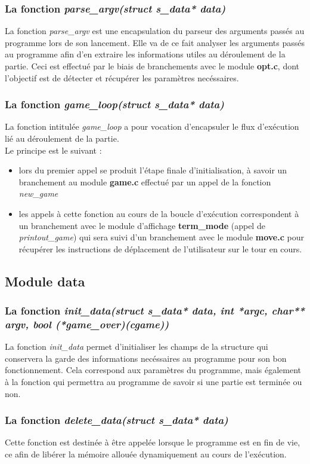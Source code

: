 \documentclass{report}
\begin{document}
\subsubsection*{La fonction \textit{parse\_argv(struct s\_data* data)}}
La fonction \textit{parse\_argv} est une encapsulation du parseur des arguments passés au programme lors de son lancement.
Elle va de ce fait analyser les arguments passés au programme afin d'en extraire les informations utiles au déroulement de la partie.
Ceci est effectué par le biais de branchements avec le module \textbf{opt.c}, dont l'objectif est de détecter et récupérer les paramètres necéssaires.
\subsubsection*{La fonction \textit{game\_loop(struct s\_data* data)}}
La fonction intitulée \textit{game\_loop} a pour vocation d'encapsuler le flux d'exécution lié au déroulement de la partie.\\
Le principe est le suivant :
\begin{itemize}
\item lors du premier appel se produit l'étape finale d'initialisation, à savoir un branchement au module \textbf{game.c} effectué par un appel de la fonction \textit{new\_game}
\item les appels à cette fonction au cours de la boucle d'exécution correspondent à un branchement avec le module d'affichage \textbf{term\_mode} (appel de \textit{printout\_game}) qui sera suivi d'un branchement avec le module \textbf{move.c} pour récupérer les instructions de déplacement de l'utilisateur sur le tour en cours.
\end{itemize}

\subsection{Module data}
\subsubsection*{La fonction \textit{init\_data(struct s\_data* data, int *argc, char** argv, bool (*game\_over)(cgame))}}
La fonction \textit{init\_data} permet d'initialiser les champs de la structure qui conservera la garde des informations necéssaires au programme pour son bon fonctionnement.
Cela correspond aux paramètres du programme, mais également à la fonction qui permettra au programme de savoir si une partie est terminée ou non.
\subsubsection*{La fonction \textit{delete\_data(struct s\_data* data)}}
Cette fonction est destinée à être appelée lorsque le programme est en fin de vie, ce afin de libérer la mémoire allouée dynamiquement au cours de l'exécution.
\end{document}
